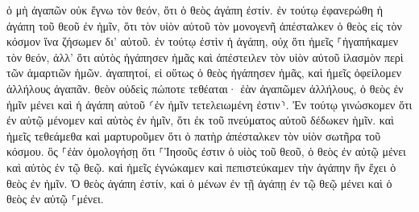 \documentclass{openreader}
\begin{document}
ὁ μὴ ἀγαπῶν οὐκ ἔγνω τὸν θεόν, ὅτι ὁ θεὸς ἀγάπη ἐστίν. 
ἐν τούτῳ ἐφανερώθη ἡ ἀγάπη τοῦ θεοῦ ἐν ἡμῖν, ὅτι τὸν υἱὸν αὐτοῦ τὸν μονογενῆ ἀπέσταλκεν ὁ θεὸς εἰς τὸν κόσμον ἵνα ζήσωμεν δι’ αὐτοῦ. 
ἐν τούτῳ ἐστὶν ἡ ἀγάπη, οὐχ ὅτι ἡμεῖς ⸀ἠγαπήκαμεν τὸν θεόν, ἀλλ’ ὅτι αὐτὸς ἠγάπησεν ἡμᾶς καὶ ἀπέστειλεν τὸν υἱὸν αὐτοῦ ἱλασμὸν περὶ τῶν ἁμαρτιῶν ἡμῶν. 
ἀγαπητοί, εἰ οὕτως ὁ θεὸς ἠγάπησεν ἡμᾶς, καὶ ἡμεῖς ὀφείλομεν ἀλλήλους ἀγαπᾶν. 
θεὸν οὐδεὶς πώποτε τεθέαται· ἐὰν ἀγαπῶμεν ἀλλήλους, ὁ θεὸς ἐν ἡμῖν μένει καὶ ἡ ἀγάπη αὐτοῦ ⸂ἐν ἡμῖν τετελειωμένη ἐστιν⸃. 
Ἐν τούτῳ γινώσκομεν ὅτι ἐν αὐτῷ μένομεν καὶ αὐτὸς ἐν ἡμῖν, ὅτι ἐκ τοῦ πνεύματος αὐτοῦ δέδωκεν ἡμῖν. 
καὶ ἡμεῖς τεθεάμεθα καὶ μαρτυροῦμεν ὅτι ὁ πατὴρ ἀπέσταλκεν τὸν υἱὸν σωτῆρα τοῦ κόσμου. 
ὃς ⸀ἐὰν ὁμολογήσῃ ὅτι ⸀Ἰησοῦς ἐστιν ὁ υἱὸς τοῦ θεοῦ, ὁ θεὸς ἐν αὐτῷ μένει καὶ αὐτὸς ἐν τῷ θεῷ. 
καὶ ἡμεῖς ἐγνώκαμεν καὶ πεπιστεύκαμεν τὴν ἀγάπην ἣν ἔχει ὁ θεὸς ἐν ἡμῖν. Ὁ θεὸς ἀγάπη ἐστίν, καὶ ὁ μένων ἐν τῇ ἀγάπῃ ἐν τῷ θεῷ μένει καὶ ὁ θεὸς ἐν αὐτῷ ⸀μένει. 
\end{document}

